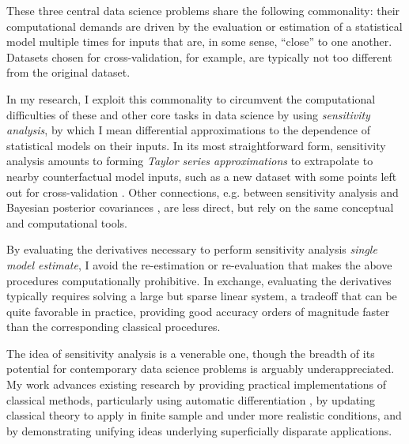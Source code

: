 
These three central data science problems share the following commonality:
their computational demands are driven by the evaluation or estimation of a
statistical model multiple times for inputs that are, in some sense,
``close'' to one another.  Datasets chosen for cross-validation, for example,
are typically not too different from the original dataset.

In my research, I exploit this commonality to circumvent the computational
difficulties of these and other core tasks in data science by using {\em
sensitivity analysis}, by which I mean differential approximations to the
dependence of statistical models on their inputs.  In its most straightforward
form, sensitivity analysis amounts to forming {\em Taylor series approximations}
to extrapolate to nearby counterfactual model inputs, such as a new dataset with
some points left out for cross-validation \citep{giordano:2018:bnpsensitivity,
giordano:2019:ij}.  Other connections, e.g. between sensitivity analysis and
Bayesian posterior covariances \citep{giordano:2018:covariances}, are less
direct, but rely on the same conceptual and computational tools.

By evaluating the derivatives necessary to perform sensitivity analysis {\em
single model estimate}, I avoid the re-estimation or re-evaluation that makes
the above procedures computationally prohibitive.  In exchange, evaluating the
derivatives typically requires solving a large but sparse linear system, a
tradeoff that can be quite favorable in practice, providing good accuracy orders
of magnitude faster than the corresponding classical procedures.

The idea of sensitivity analysis is a venerable one, though the breadth of its
potential for contemporary data science problems is arguably underappreciated.
My work advances existing research by providing practical implementations of
classical methods, particularly using automatic differentiation
\citep{baydin:2015:automatic}, by updating classical theory to apply in finite
sample and under more realistic conditions, and by demonstrating unifying ideas
underlying superficially disparate applications.

